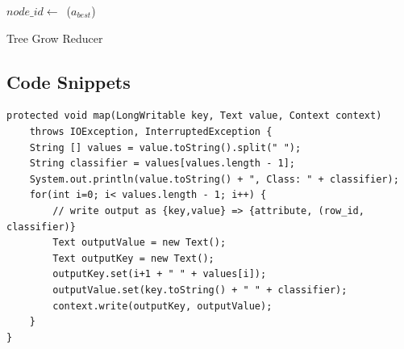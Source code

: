 \documentclass{article}
\begin{document}


\IncMargin{1em}
\begin{algorithm}[H]
\DontPrintSemicolon
{}
\BlankLine
$node\_id\leftarrow$\ \hash(${a_{best}}$)\;
\caption{Tree Grow Reducer\label{algo:atred}}
\end{algorithm}
\DecMargin{1em}


\subsection{Code Snippets}


\begin{lstlisting}[caption={Attrib Table Mapper code snippet},label={lst:attrtblmap},style=MyJavaStyle]
protected void map(LongWritable key, Text value, Context context)
    throws IOException, InterruptedException {
    String [] values = value.toString().split(" ");
    String classifier = values[values.length - 1];
    System.out.println(value.toString() + ", Class: " + classifier);
    for(int i=0; i< values.length - 1; i++) {
        // write output as {key,value} => {attribute, (row_id, classifier)}
        Text outputValue = new Text();
        Text outputKey = new Text();
        outputKey.set(i+1 + " " + values[i]);
        outputValue.set(key.toString() + " " + classifier);
        context.write(outputKey, outputValue);
    }
}
\end{lstlisting}

\end{document}
